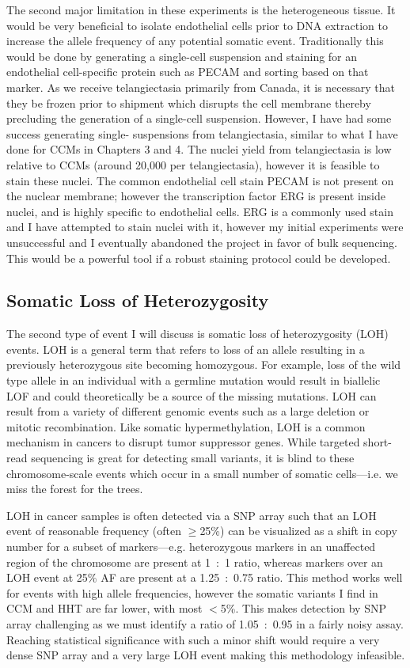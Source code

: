 The second major limitation in these experiments is the heterogeneous tissue. It would be very beneficial to isolate endothelial cells prior to DNA extraction to increase the allele frequency of any potential somatic event. Traditionally this would be done by generating a single-cell suspension and staining for an endothelial cell-specific protein such as PECAM and sorting based on that marker. As we receive telangiectasia primarily from Canada, it is necessary that they be frozen prior to shipment which disrupts the cell membrane thereby precluding the generation of a single-cell suspension. However, I have had some success generating single- suspensions from telangiectasia, similar to what I have done for CCMs in Chapters 3 and 4. The nuclei yield from telangiectasia is low relative to CCMs (around 20,000 per telangiectasia), however it is feasible to stain these nuclei. The common endothelial cell stain PECAM is not present on the nuclear membrane; however the transcription factor ERG is present inside nuclei, and is highly specific to endothelial cells. ERG is a commonly used stain and I have attempted to stain nuclei with it, however my initial experiments were unsuccessful and I eventually abandoned the project in favor of bulk sequencing. This would be a powerful tool if a robust staining protocol could be developed. 

\subsection{Somatic Loss of Heterozygosity}
The second type of event I will discuss is somatic loss of heterozygosity (LOH) events. LOH is a general term that refers to loss of an allele resulting in a previously heterozygous site becoming homozygous. For example, loss of the wild type  allele in an individual with a germline  mutation would result in biallelic LOF and could theoretically be a source of the missing mutations. LOH can result from a variety of different genomic events such as a large deletion or mitotic recombination. Like somatic hypermethylation, LOH is a common mechanism in cancers to disrupt tumor suppressor genes. While targeted short-read sequencing is great for detecting small variants, it is blind to these chromosome-scale events which occur in a small number of somatic cells---i.e. we miss the forest for the trees. 

LOH in cancer samples is often detected via a SNP array such that an LOH event of reasonable frequency (often $\geq$25\%) can be visualized as a shift in copy number for a subset of markers---e.g. heterozygous markers in an unaffected region of the chromosome are present at 1~:~1 ratio, whereas markers over an LOH event at 25\% AF are present at a 1.25~:~0.75 ratio. This method works well for events with high allele frequencies, however the somatic variants I find in CCM and HHT are far lower, with most $<$5\%. This makes detection by SNP array challenging as we must identify a ratio of 1.05~:~0.95 in a fairly noisy assay. Reaching statistical significance with such a minor shift would require a very dense SNP array and a very large LOH event making this methodology infeasible. 

